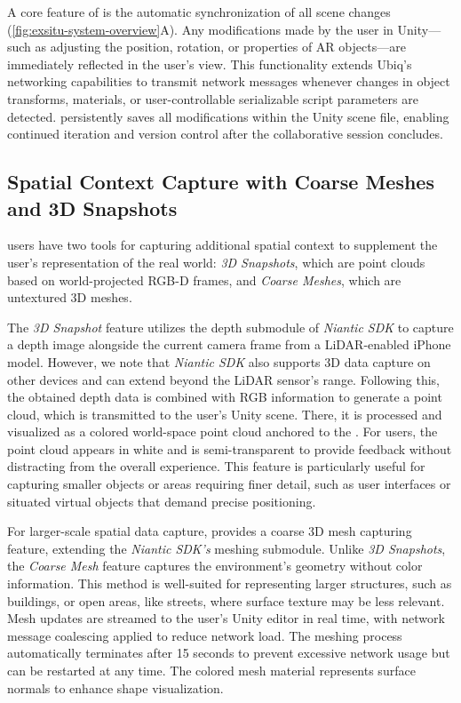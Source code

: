 A core feature of \SystemName is the automatic synchronization of all scene changes (\cref{fig:exsitu-system-overview}A). Any modifications made by the \exsitu user in Unity---such as adjusting the position, rotation, or properties of AR objects---are immediately reflected in the \insitu user's view. This functionality extends Ubiq's networking capabilities to transmit network messages whenever changes in object transforms, materials, or user-controllable serializable script parameters are detected. \SystemName persistently saves all modifications within the Unity scene file, enabling continued iteration and version control after the collaborative session concludes.

\subsection{Spatial Context Capture with Coarse Meshes and 3D Snapshots}
\Insitu users have two tools for capturing additional spatial context to supplement the \exsitu user's representation of the real world: \textit{3D Snapshots}, which are point clouds based on world-projected RGB-D frames, and \textit{Coarse Meshes}, which are untextured 3D meshes.

The \textit{3D Snapshot} feature utilizes the depth submodule of \textit{Niantic SDK} to capture a depth image alongside the current camera frame from a LiDAR-enabled iPhone model. However, we note that \textit{Niantic SDK} also supports 3D data capture on other devices and can extend beyond the LiDAR sensor's range. Following this, the obtained depth data is combined with RGB information to generate a point cloud, which is transmitted to the \exsitu user's Unity scene. There, it is processed and visualized as a colored world-space point cloud anchored to the \locMesh. For \insitu users, the point cloud appears in white and is semi-transparent to provide feedback without distracting from the overall experience. This feature is particularly useful for capturing smaller objects or areas requiring finer detail, such as user interfaces or situated virtual objects that demand precise positioning. 

For larger-scale spatial data capture, \SystemName provides a coarse 3D mesh capturing feature, extending the \textit{Niantic SDK's} meshing submodule. Unlike \textit{3D Snapshots}, the \textit{Coarse Mesh} feature captures the environment's geometry without color information. This method is well-suited for representing larger structures, such as buildings, or open areas, like streets, where surface texture may be less relevant. Mesh updates are streamed to the \exsitu user's Unity editor in real time, with network message coalescing applied to reduce network load. The meshing process automatically terminates after 15 seconds to prevent excessive network usage but can be restarted at any time. The colored mesh material represents surface normals to enhance shape visualization.

